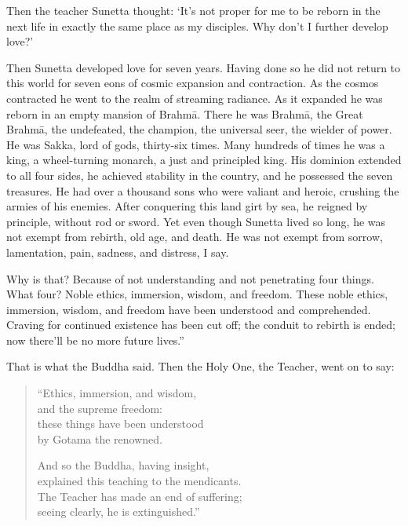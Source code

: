 \documentclass[12pt,openany]{book}%
\begin{document}
Then the teacher Sunetta thought: ‘It’s not proper for me to be reborn in the next life in exactly the same place as my disciples. Why don’t I further develop love?’ 

Then Sunetta developed love for seven years. Having done so he did not return to this world for seven eons of cosmic expansion and contraction. As the cosmos contracted he went to the realm of streaming radiance. As it expanded he was reborn in an empty mansion of \textsanskrit{Brahmā}. There he was \textsanskrit{Brahmā}, the Great \textsanskrit{Brahmā}, the undefeated, the champion, the universal seer, the wielder of power. He was Sakka, lord of gods, thirty-six times. Many hundreds of times he was a king, a wheel-turning monarch, a just and principled king. His dominion extended to all four sides, he achieved stability in the country, and he possessed the seven treasures. He had over a thousand sons who were valiant and heroic, crushing the armies of his enemies. After conquering this land girt by sea, he reigned by principle, without rod or sword. Yet even though Sunetta lived so long, he was not exempt from rebirth, old age, and death. He was not exempt from sorrow, lamentation, pain, sadness, and distress, I say. 

Why is that? Because of not understanding and not penetrating four things. What four? Noble ethics, immersion, wisdom, and freedom. These noble ethics, immersion, wisdom, and freedom have been understood and comprehended. Craving for continued existence has been cut off; the conduit to rebirth is ended; now there’ll be no more future lives.” 

That is what the Buddha said. Then the Holy One, the Teacher, went on to say: 

\begin{verse}%
“Ethics, immersion, and wisdom, \\
and the supreme freedom: \\
these things have been understood \\
by Gotama the renowned. 

And so the Buddha, having insight, \\
explained this teaching to the mendicants. \\
The Teacher has made an end of suffering; \\
seeing clearly, he is extinguished.” 

%
\end{verse}
\end{document}
